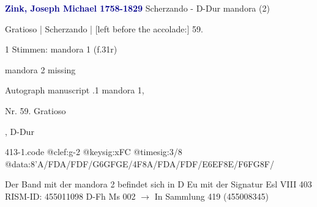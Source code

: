 \documentclass[twocolumn]{book}
\begin{document}
\newline \par \vspace{7pt} \textcolor{darkblue}{\textbf{Zink, Joseph Michael  1758-1829}}
\newline Scherzando - D-Dur
\newline mandora (2)
\newline \begin{itshape}[f.31r, at left:] Gratioso | Scherzando | [left before the accolade:] 59.\end{itshape} 
\newline \textcolor{darkblue}{}  1 Stimmen: mandora 1  (f.31r)
\newline \begin{small} mandora 2 missing\end{small} 
\newline Autograph manuscript
.1  mandora 1, \begin{itshape}Nr. 59. Gratioso\end{itshape}, D-Dur  
\begin{filecontents*}{413-1.code}
@clef:g-2
@keysig:xFC
@timesig:3/8
@data:8'A/FDA/FDF/{G6GFGE}/4F8A/FDA/FDF/{E6EF8E}/{F6FG8F}/
\end{filecontents*}
\newline
%
\newline Der Band mit der mandora 2 befindet sich in D Eu mit der Signatur Esl VIII 403
\newline RISM-ID: 455011098
\newline D-Fh  Ms 002
\newline $\rightarrow$ In Sammlung 419 (455008345)
      
\end{document}
